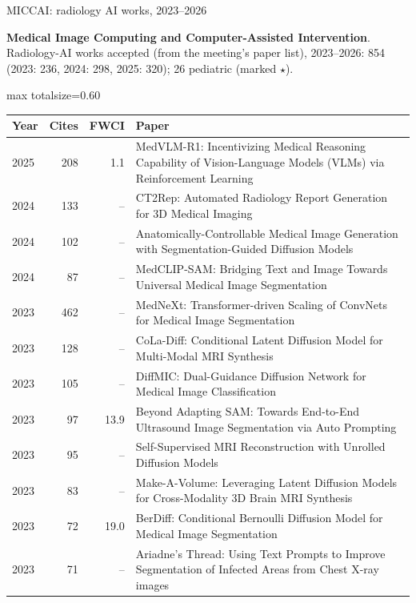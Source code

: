 \documentclass[aspectratio=169]{beamer}
\renewcommand{\arraystretch}{1.08}
\begin{document}
\begin{frame}[category=Conferences]{MICCAI: radiology AI works, 2023--2026}
{\scriptsize \textbf{Medical Image Computing and Computer-Assisted Intervention}. Radiology-AI works accepted (from the meeting's paper list), 2023--2026: 854 (2023: 236, 2024: 298, 2025: 320); 26 pediatric (marked $\star$).\par}\vspace{2pt}
\tiny
\begin{adjustbox}{max totalsize={\textwidth}{0.60\textheight}}
\renewcommand{\arraystretch}{1.2}
\begin{tabular}{|l|r|r|>{\raggedright\arraybackslash}p{}|}
\hline \textbf{Year} & \textbf{Cites} & \textbf{FWCI} & \textbf{Paper} \\ \hline
2025 & 208 & 1.1 & MedVLM-R1: Incentivizing Medical Reasoning Capability of Vision-Language Models (VLMs) via Reinforcement Learning \\ \hline
2024 & 133 & -- & CT2Rep: Automated Radiology Report Generation for 3D Medical Imaging \\ \hline
2024 & 102 & -- & Anatomically-Controllable Medical Image Generation with Segmentation-Guided Diffusion Models \\ \hline
2024 & 87 & -- & MedCLIP-SAM: Bridging Text and Image Towards Universal Medical Image Segmentation \\ \hline
2023 & 462 & -- & MedNeXt: Transformer-driven Scaling of ConvNets for Medical Image Segmentation \\ \hline
2023 & 128 & -- & CoLa-Diff: Conditional Latent Diffusion Model for Multi-Modal MRI Synthesis \\ \hline
2023 & 105 & -- & DiffMIC: Dual-Guidance Diffusion Network for Medical Image Classification \\ \hline
2023 & 97 & 13.9 & Beyond Adapting SAM: Towards End-to-End Ultrasound Image Segmentation via Auto Prompting \\ \hline
2023 & 95 & -- & Self-Supervised MRI Reconstruction with Unrolled Diffusion Models \\ \hline
2023 & 83 & -- & Make-A-Volume: Leveraging Latent Diffusion Models for Cross-Modality 3D Brain MRI Synthesis \\ \hline
2023 & 72 & 19.0 & BerDiff: Conditional Bernoulli Diffusion Model for Medical Image Segmentation \\ \hline
2023 & 71 & -- & Ariadne's Thread: Using Text Prompts to Improve Segmentation of Infected Areas from Chest X-ray images \\ \hline

\end{tabular}
\end{adjustbox}
\end{frame}
\end{document}
